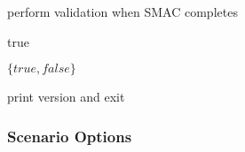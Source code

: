 \documentclass[manual.tex]{subfiles}
\begin{document}
\begin{description}[itemsep=.5pt,parsep=.5pt]
		\vspace{-5pt}		\begin{description}[itemsep=.5pt,parsep=.5pt]
			\item[Default Value:] %
		\end{description}
		\item[-~$\!$-~$\!$validation] perform validation when SMAC completes

		\vspace{-5pt}		\begin{description}[itemsep=.5pt,parsep=.5pt]
			\item[Default Value:] true 
			\item[Domain:] $\{true, false\}$ 
		\end{description}
		\item[-~$\!$v] print version and exit

	\end{description}


	\subsubsection{Scenario Options}
\end{document}
